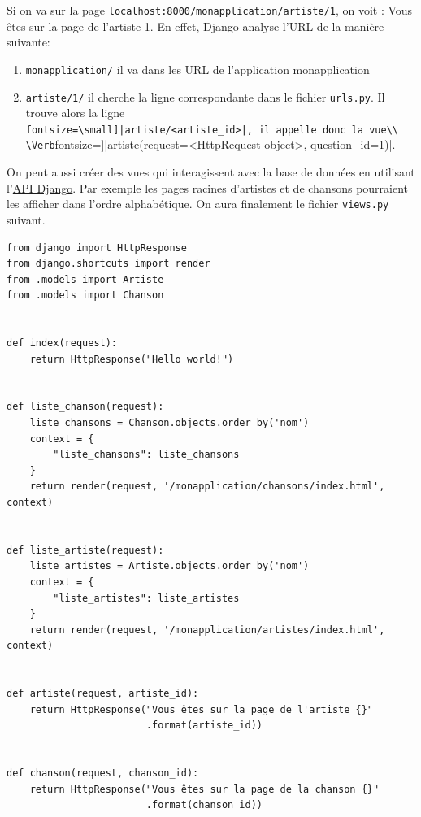 \documentclass[a4paper, 10pt]{article}
\begin{document}
Si on va sur la page \texttt{localhost:8000/monapplication/artiste/1}, on voit : \og Vous êtes sur la page de l'artiste 1\fg{}. En effet, Django analyse l'URL de la manière suivante:
\begin{enumerate}
    \item \texttt{monapplication/} il va dans les URL de l’application monapplication
    \item \texttt{artiste/1/} il cherche la ligne correspondante dans le fichier \texttt{urls.py}. Il trouve alors la ligne\\ \Verb[fontsize=\small]|artiste/<artiste_id>|, il appelle donc la vue\\ \Verb[fontsize=\small]|artiste(request=<HttpRequest object>, question_id=1)|.
\end{enumerate}

On peut aussi créer des vues qui interagissent avec la base de données en utilisant l'\href{https://docs.djangoproject.com/fr/2.0/topics/db/queries/}{API Django}. Par exemple les pages racines d'artistes et de chansons pourraient les afficher dans l'ordre alphabétique. On aura finalement le fichier \texttt{views.py} suivant.

\begin{verbatim}
from django import HttpResponse
from django.shortcuts import render
from .models import Artiste
from .models import Chanson


def index(request):
    return HttpResponse("Hello world!")


def liste_chanson(request):
    liste_chansons = Chanson.objects.order_by('nom')
    context = {
        "liste_chansons": liste_chansons
    }
    return render(request, '/monapplication/chansons/index.html', context)


def liste_artiste(request):
    liste_artistes = Artiste.objects.order_by('nom')
    context = {
        "liste_artistes": liste_artistes
    }
    return render(request, '/monapplication/artistes/index.html', context)


def artiste(request, artiste_id):
    return HttpResponse("Vous êtes sur la page de l'artiste {}"
                        .format(artiste_id))


def chanson(request, chanson_id):
    return HttpResponse("Vous êtes sur la page de la chanson {}"
                        .format(chanson_id))

\end{verbatim}
\end{document}
